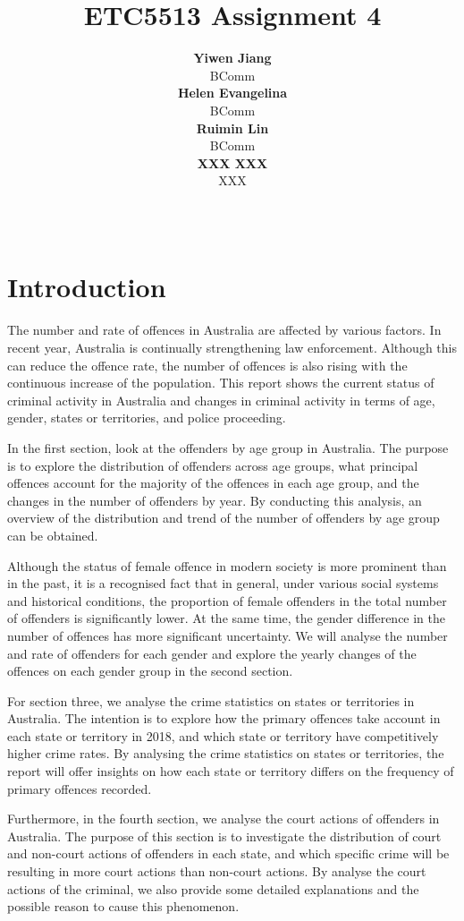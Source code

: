 \documentclass[11pt,a4paper,]{article}
\title{ETC5513 Assignment 4}
\author{\sf\Large\textbf{ Yiwen Jiang}\\ {\sf\large BComm\\[0.5cm]} \sf\Large\textbf{ Helen Evangelina}\\ {\sf\large BComm\\[0.5cm]} \sf\Large\textbf{ Ruimin Lin}\\ {\sf\large BComm\\[0.5cm]} \sf\Large\textbf{ XXX XXX}\\ {\sf\large XXX\\[0.5cm]}}
\date{\sf\Date~\Month~\Year}
\makeatletter
\def\titlepage{\front{\expandafter{\@title}}{\@author}{\@organization}}
\makeatother
\begin{document}
\titlepage

{
\setcounter{tocdepth}{2}
\tableofcontents
}
\newpage

\hypertarget{introduction}{%
\section{Introduction}\label{introduction}}

The number and rate of offences in Australia are affected by various factors. In recent year, Australia is continually strengthening law enforcement. Although this can reduce the offence rate, the number of offences is also rising with the continuous increase of the population. This report shows the current status of criminal activity in Australia and changes in criminal activity in terms of age, gender, states or territories, and police proceeding.

In the first section, look at the offenders by age group in Australia. The purpose is to explore the distribution of offenders across age groups, what principal offences account for the majority of the offences in each age group, and the changes in the number of offenders by year. By conducting this analysis, an overview of the distribution and trend of the number of offenders by age group can be obtained.

Although the status of female offence in modern society is more prominent than in the past, it is a recognised fact that in general, under various social systems and historical conditions, the proportion of female offenders in the total number of offenders is significantly lower. At the same time, the gender difference in the number of offences has more significant uncertainty. We will analyse the number and rate of offenders for each gender and explore the yearly changes of the offences on each gender group in the second section.

For section three, we analyse the crime statistics on states or territories in Australia. The intention is to explore how the primary offences take account in each state or territory in 2018, and which state or territory have competitively higher crime rates. By analysing the crime statistics on states or territories, the report will offer insights on how each state or territory differs on the frequency of primary offences recorded.

Furthermore, in the fourth section, we analyse the court actions of offenders in Australia. The purpose of this section is to investigate the distribution of court and non-court actions of offenders in each state, and which specific crime will be resulting in more court actions than non-court actions. By analyse the court actions of the criminal, we also provide some detailed explanations and the possible reason to cause this phenomenon.
\end{document}
